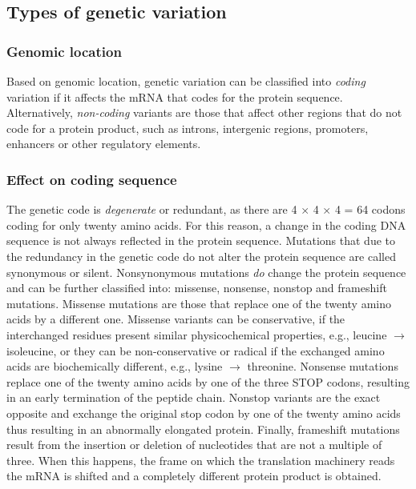 \subsection{Types of genetic variation}

\subsubsection{Genomic location}

Based on genomic location, genetic variation can be classified into \textit{coding} variation if it affects the mRNA that codes for the protein sequence. Alternatively, \textit{non-coding} variants are those that affect other regions that do not code for a protein product, such as introns, intergenic regions, promoters, enhancers or other regulatory elements.

\subsubsection{Effect on coding sequence}

The genetic code is \textit{degenerate} or redundant, as there are 4 $\times$ 4 $\times$ 4 = 64 codons coding for only twenty amino acids. For this reason, a change in the coding DNA sequence is not always reflected in the protein sequence. Mutations that due to the redundancy in the genetic code do not alter the protein sequence are called synonymous or silent. Nonsynonymous mutations \textit{do} change the protein sequence and can be further classified into: missense, nonsense, nonstop and frameshift mutations. Missense mutations are those that replace one of the twenty amino acids by a different one. Missense variants can be conservative, if the interchanged residues present similar physicochemical properties, e.g., leucine $\rightarrow$ isoleucine, or they can be non-conservative or radical if the exchanged amino acids are biochemically different, e.g., lysine $\rightarrow$ threonine. Nonsense mutations replace one of the twenty amino acids by one of the three STOP codons, resulting in an early termination of the peptide chain. Nonstop variants are the exact opposite and exchange the original stop codon by one of the twenty amino acids thus resulting in an abnormally elongated protein. Finally, frameshift mutations result from the insertion or deletion of nucleotides that are not a multiple of three. When this happens, the frame on which the translation machinery reads the mRNA is shifted and a completely different protein product is obtained.

